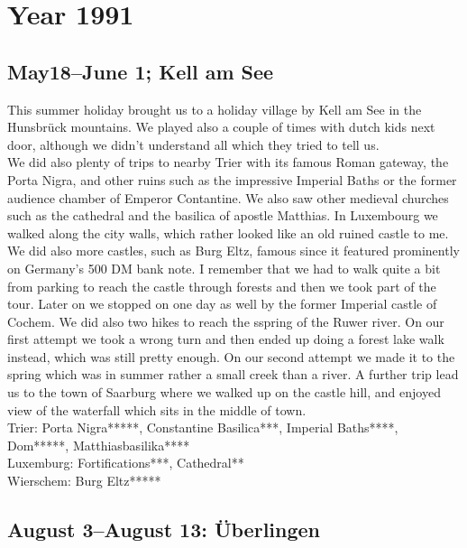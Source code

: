 \chapter{Year 1991}
\label{1991}

\section{May18--June 1; Kell am See}
\label{1991:Kell}

This summer holiday brought us to a holiday village by Kell am See in the Hunsbr\"uck mountains. We played also a couple of times with dutch kids next door, although we didn't understand all which they tried to tell us.\\
We did also plenty of trips to nearby Trier with its famous Roman gateway, the Porta Nigra, and other ruins such as the impressive Imperial Baths or the former audience chamber of Emperor Contantine. We also saw other medieval churches such as the cathedral and the basilica of apostle Matthias. In Luxembourg we walked along the city walls, which rather looked like an old ruined castle to me. We did also more castles, such as Burg Eltz, famous since it featured prominently on Germany's 500 DM bank note. I remember that we had to walk quite a bit from parking to reach the castle through forests and then we took part of the tour. Later on we stopped on one day as well by the former Imperial castle of Cochem. We did also two hikes to reach the sspring of the Ruwer river. On our first attempt we took a wrong turn and then ended up doing a forest lake walk instead, which was still pretty enough. On our second attempt we made it to the spring which was in summer rather a small creek than a river. A further trip lead us to the town of Saarburg where we walked up on the castle hill, and enjoyed view of the waterfall which sits in the middle of town.\\

Trier: Porta Nigra*****, Constantine Basilica***, Imperial Baths****, Dom*****, Matthiasbasilika****\\
Luxemburg: Fortifications***, Cathedral**\\
Wierschem: Burg Eltz*****\\

\section{August 3--August 13: \"Uberlingen}
\label{1991:Uberlingen}

